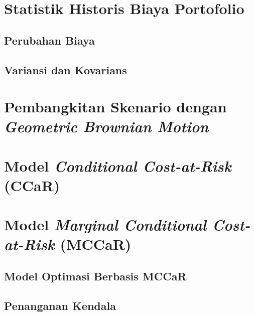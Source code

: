     \section{Statistik Historis Biaya Portofolio}\label{sec:historical cost}

        \subsection{Perubahan Biaya}\label{subsec:cost change}

        \subsection{Variansi dan Kovarians}\label{subsec:covariance}

    \section{Pembangkitan Skenario dengan \textit{Geometric Brownian Motion}}\label{sec:gbm theory}

    \section{Model \textit{Conditional Cost-at-Risk} (CCaR)}\label{sec:ccar}

    \section{Model \textit{Marginal Conditional Cost-at-Risk} (MCCaR)}\label{sec:mccar}

        \subsection{Model Optimasi Berbasis MCCaR}\label{subsec:mccar optimization}

        \subsection{Penanganan Kendala}\label{subsec:constraint handling}

